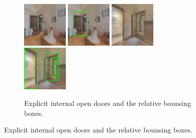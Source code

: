 \begin{figure}[h!]
	\begin{subfigure}[b]{\linewidth}
		\centering
		\includegraphics[width=0.24\textwidth]{images/explicitinternalopen1.png}
		\hfill
		\includegraphics[width=0.24\textwidth]{images/explicitinternalopen1boxed.png}
		\hfill
		\includegraphics[width=0.24\textwidth]{images/explicitinternalopen2.png}
		\hfill
		\includegraphics[width=0.24\textwidth]{images/explicitinternalopen2boxed.png}
		\caption{Explicit internal open doors and the relative bounsing boxes.}
	\end{subfigure}
	

\end{figure}

